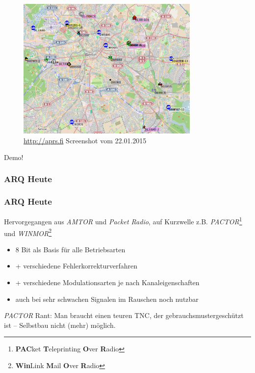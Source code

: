 \begin{frame}
  \begin{center}
    \begin{figure}
      \includegraphics[width=0.8\textwidth,height=.8\textheight,keepaspectratio]{e16/APRS.png}
      \caption{\ExternalLink\url{http://aprs.fi} Screenshot vom 22.01.2015}
    \end{figure}
    \Large Demo!
  \end{center}

\end{frame}

\subsubsection{ARQ Heute}

\begin{frame}
  \frametitle{ARQ Heute}

  Hervorgegangen aus \emph{AMTOR} und \emph{Packet Radio}, auf Kurzwelle z.B.
  \emph{PACTOR}\footnote{\textbf{PAC}ket \textbf{T}eleprinting \textbf{O}ver
  \textbf{R}adio} und \emph{WINMOR}\footnote{\textbf{Win}Link \textbf{M}ail
  \textbf{O}ver \textbf{R}adio}

  \begin{itemize}
    \item 8 Bit als Basis für alle Betriebsarten
    \item + verschiedene Fehlerkorrekturverfahren
    \item + verschiedene Modulationsarten je nach Kanaleigenschaften
    \item auch bei sehr schwachen Signalen im Rauschen noch nutzbar
  \end{itemize}

  \vspace{0.5cm}

  \emph{PACTOR} Rant: Man braucht einen teuren TNC, der
  gebrauchsmustergeschützt ist -- Selbstbau nicht (mehr) möglich.

\end{frame}

